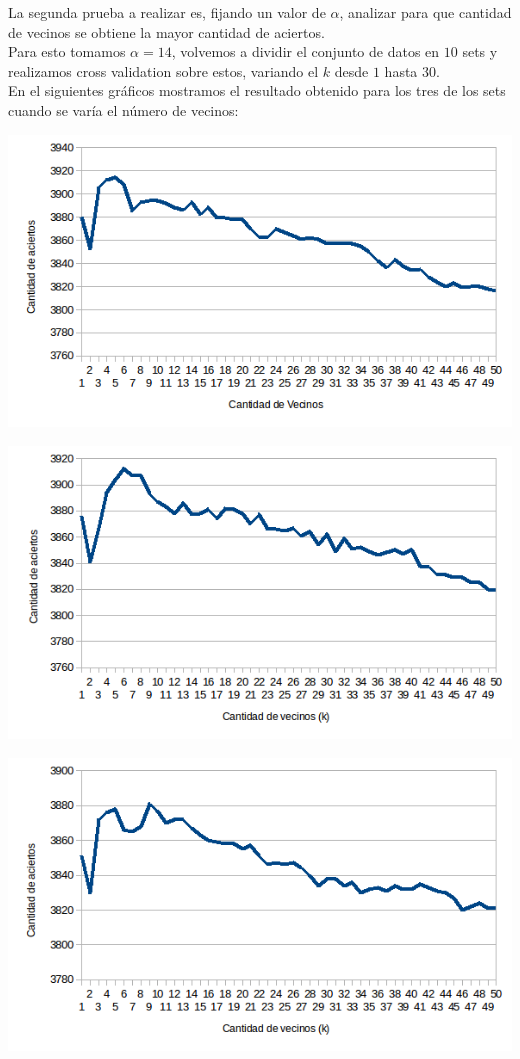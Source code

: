 La segunda prueba a realizar es, fijando un valor de $\alpha$, analizar para que cantidad de vecinos se obtiene la mayor cantidad de aciertos.
\\
Para esto tomamos $\alpha = 14$, volvemos a dividir el conjunto de datos en $10$ sets y realizamos cross validation sobre estos, variando el $k$ desde $1$ hasta $30$.
\\
En el siguientes gráficos mostramos el resultado obtenido para los tres de los sets cuando se varía el número de vecinos:
\begin{center}
\includegraphics[scale=0.6]{nuevosResultados/pca/k/1.png}\\
\end{center}
\begin{center}
\includegraphics[scale=0.6]{nuevosResultados/pca/k/2.png}\\
\end{center}
\begin{center}
\includegraphics[scale=0.6]{nuevosResultados/pca/k/3.png}\\
\end{center}

